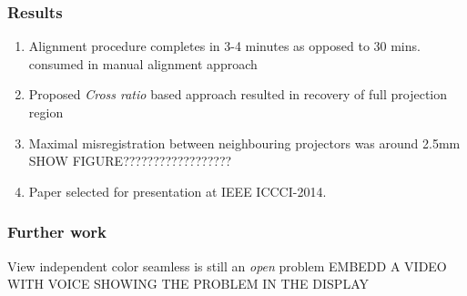 \documentclass{beamer}
\begin{document}
\begin{frame}
\frametitle{Results}
\begin{enumerate}
\item Alignment procedure completes in 3-4 minutes as opposed to 30 mins. consumed in manual alignment approach
\item Proposed \textit{Cross ratio} based approach resulted in recovery of full projection region
\item Maximal misregistration between neighbouring projectors was around 2.5mm
SHOW FIGURE??????????????????
\item Paper selected for presentation at IEEE ICCCI-2014.
\end{enumerate}
\end{frame}


\begin{frame}
\frametitle{Further work}
View independent color seamless is still an \textit{open} problem
EMBEDD A VIDEO WITH VOICE SHOWING THE PROBLEM IN THE DISPLAY
\end{frame}
\end{document}
